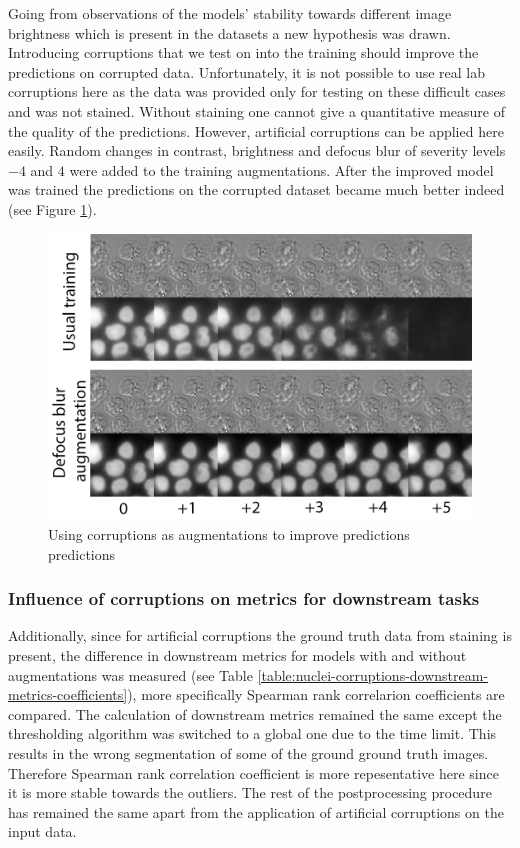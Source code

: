 Going from observations of the models' stability towards different image brightness which is present in the datasets a new hypothesis was drawn. Introducing corruptions that we test on into the training should improve the predictions on corrupted data. Unfortunately, it is not possible to use real lab corruptions here as the data was provided only for testing on these difficult cases and was not stained. Without staining one cannot give a quantitative measure of the quality of the predictions. However, artificial corruptions can be applied here easily. Random changes in contrast, brightness and defocus blur of severity levels $-4$ and $4$ were added to the training augmentations. After the improved model was trained the predictions on the corrupted dataset became much better indeed (see Figure \ref{fig:augments-help}).

\begin{figure}[htb]
	\begin{center}
		\includegraphics[width=0.4\linewidth]{bilder/stability/augments-help.png}
		\caption{Using corruptions as augmentations to improve predictions predictions}\label{fig:augments-help}
	\end{center}
\end{figure}

\subsubsection{Influence of corruptions on metrics for downstream tasks}
Additionally, since for artificial corruptions the ground truth data from staining is present, the difference in downstream metrics for models with and without augmentations was measured (see Table \ref{table:nuclei-corruptions-downstream-metrics-coefficients}), more specifically Spearman rank correlarion coefficients are compared. The calculation of downstream metrics remained the same except the thresholding algorithm was switched to a global one due to the time limit. This results in the wrong segmentation of some of the ground ground truth images. Therefore Spearman rank correlation coefficient is more repesentative here since it is more stable towards the outliers. The rest of the postprocessing procedure has remained the same apart from the application of artificial corruptions on the input data.

